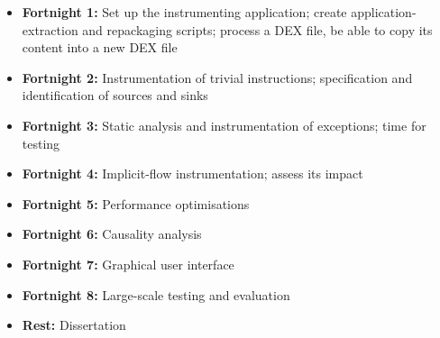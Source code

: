 \documentclass[12pt]{article}
\begin{document}
\begin{itemize}
	\item{\textbf{Fortnight 1:} Set up the instrumenting application; 
	      create application-extraction and repackaging scripts; process 
	      a DEX file, be able to copy its content into a new DEX file}
	\item{\textbf{Fortnight 2:} Instrumentation of trivial instructions;
	      specification and identification of sources and sinks}
	\item{\textbf{Fortnight 3:} Static analysis and instrumentation of 
	      exceptions; time for testing}
	\item{\textbf{Fortnight 4:} Implicit-flow instrumentation; assess 
	      its impact}
	\item{\textbf{Fortnight 5:} Performance optimisations}
	\item{\textbf{Fortnight 6:} Causality analysis}
	\item{\textbf{Fortnight 7:} Graphical user interface}
	\item{\textbf{Fortnight 8:} Large-scale testing and evaluation}
	\item{\textbf{Rest:} Dissertation}
\end{itemize}

\printbibliography
\end{document}

